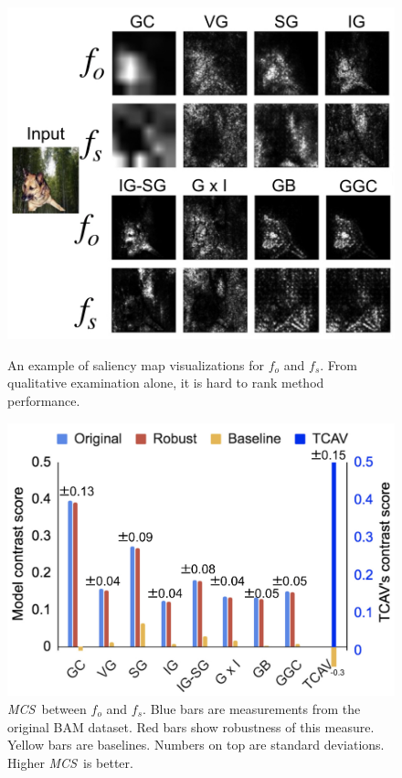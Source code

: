 \documentclass[twoside]{article}
\newcommand{\MCS}{\textit{MCS}}
\begin{document}
\begin{figure}[ht]
\centering
\begin{minipage}{.48\textwidth}
  \centering
  \includegraphics[width=1.\linewidth]{figures/mc_demo.jpg}
  \caption{
  An example of saliency map visualizations for $f_o$ and $f_s$. From qualitative examination alone, it is hard to rank method performance.
  }
  \label{fig:mc_demo}
\end{minipage}
  \hfill
\begin{minipage}{.48\textwidth}
  \centering
  \includegraphics[width=1.\linewidth]{figures/mc_bar.jpg}
  \caption{\MCS~between $f_o$ and $f_s$. Blue bars are measurements from the original BAM dataset. Red bars show robustness of this measure. Yellow bars are baselines. Numbers on top are standard deviations. Higher \MCS~is better.}
  \label{fig:mc_bar}
\end{minipage}
\end{figure}
\end{document}
